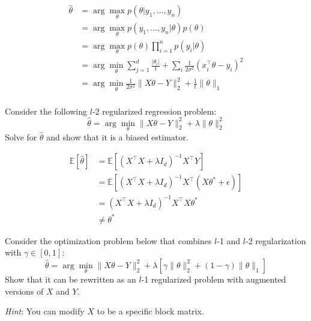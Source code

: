 \begin{Parts}
\begin{solution}
\begin{align*}
	\hat \theta & = \arg\max_\theta p(\theta | y_1, \ldots, y_n) \\
	& = \arg\max_\theta p(y_1, \ldots, y_n | \theta) p(\theta) \\
	& = \arg\max_\theta p(\theta) \prod_{i = 1}^n p(y_i | \theta) \\
	& = \arg\min_\theta  \sum_{j = 1}^d \frac{|\theta_i|}{t} + \sum_i \frac{1}{2\sigma^2} \left(x_i^\top \theta - y_i\right)^2 \\
	& = \arg\min_\theta \frac{1}{2\sigma^2}\| X\theta - Y\|_2^2 + \frac{1}{t}\|\theta\|_1 \\
\end{align*}
\end{solution}

\Part  Consider the following $l$-2 regularized regression problem:
\begin{equation}\label{eq:ridge}
 \hat \theta = \arg\min_\theta  \| X\theta - Y\|^2_2 + \lambda \|\theta\|_2^2
\end{equation}Solve for $\hat \theta$ and show that it is a biased estimator.

\begin{solution}
\begin{align*}
\mathbb E [\hat \theta] & = \mathbb E \left[ \left(X^\top X + \lambda I_d \right)^{-1} X^\top Y  \right] \\
		& = \mathbb E \left[ \left(X^\top X + \lambda I_d \right)^{-1} X^\top (X \theta^* + \epsilon) \right] \\
		& = \left(X^\top X + \lambda I_d \right)^{-1} X^\top X \theta^* \\
		& \neq \theta^*
\end{align*}
\end{solution}

\Part Consider the optimization problem below that combines $l$-1 and $l$-2 regularization with $\gamma \in [0, 1]$:
\begin{equation}\label{eq:elastic}
 \hat \theta = \arg\min_\theta  \| X\theta - Y\|^2_2 +  \lambda \left[ \gamma \|\theta\|_2^2  + (1 - \gamma)\|\theta\|_1 \right]
\end{equation}
Show that it can be rewritten as an $l$-1 regularized problem with augmented versions of $X$ and $Y$.

\textit{Hint}: You can modify $X$ to be a specific block matrix.


\end{Parts}
